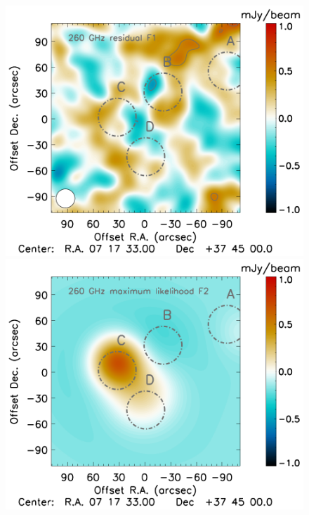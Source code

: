 \documentclass[twocolumn,traditabstract]{aa}
\begin{document}
\begin{figure}[h]
\includegraphics[trim=2.3cm 0.7cm 3.33cm 0cm, clip=true, totalheight=4cm]{Figure/MCMC_residual_1mm_ksz2_F1.pdf}
\includegraphics[trim=2.3cm 0.7cm 3.33cm 0cm, clip=true, totalheight=4cm]{Figure/MCMC_best_fit_1mm_ksz2_F2.pdf}

\end{figure}
\end{document}
